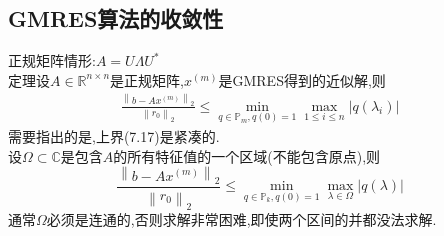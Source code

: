 \documentclass[12pt,a4paper]{article}
\begin{document}
\subsection*{GMRES算法的收敛性}
正规矩阵情形:{\color{blue}$A=U \Lambda U^{*}$}\\
{\color{blue}定理}\quad 设$A \in \mathbb{R}^{n \times n}$是正规矩阵,$x^{(m)}$是GMRES得到的近似解,则
\begin{align*}
\frac{\left\|b-A x^{(m)}\right\|_{2}}{\left\|r_{0}\right\|_{2}} \leq \min _{q \in \mathbb{P}_{m}, q(0)=1} \max _{1 \leq i \leq n}\left|q\left(\lambda_{i}\right)\right|
\tag{7.17}
\end{align*}
需要指出的是,上界(7.17)是紧凑的.\\
设$\Omega \subset \mathbb{C}$是包含$A$的所有特征值的一个区域(不能包含原点),则
$$
\frac{\left\|b-A x^{(m)}\right\|_{2}}{\left\|r_{0}\right\|_{2}} \leq \min _{q \in \mathbb{P}_{k}, q(0)=1} \max _{\lambda \in \Omega}|q(\lambda)|
$$
通常$\Omega$必须是连通的,否则求解非常困难,即使两个区间的并都没法求解.\\
\end{document}
